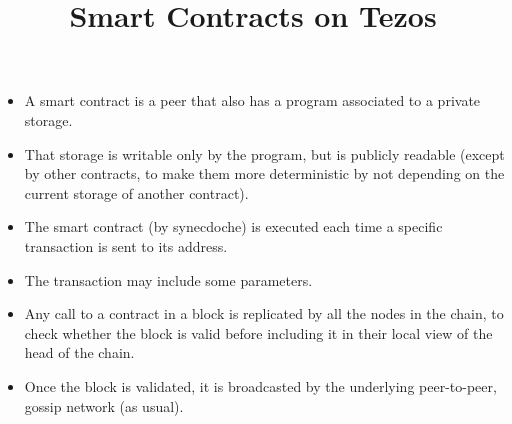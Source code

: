 \documentclass[wide]{slides}
\begin{document}
\begin{slide}
  \title{Smart Contracts on Tezos}

  \begin{itemize}

    \item A smart contract is a peer that also has a program
      associated to a private storage.

    \item That storage is writable only by the program, but is
      publicly readable (except by other contracts, to make them more
      deterministic by not depending on the current storage of another
      contract).

    \item The smart contract (by synecdoche) is executed each time a
      specific transaction is sent to its address.

    \item The transaction may include some parameters.

    \item Any call to a contract in a block is replicated by all the
      nodes in the chain, to check whether the block is valid before
      including it in their local view of the head of the chain.

    \item Once the block is validated, it is broadcasted by the
      underlying peer-to-peer, gossip network (as usual).

  \end{itemize}

\end{slide}
\end{document}
